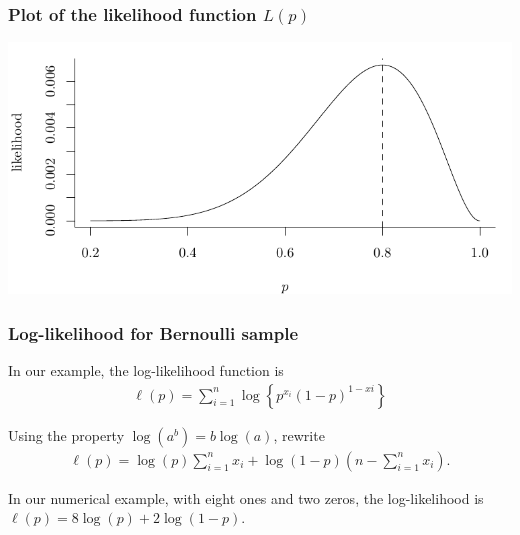 \documentclass{beamer}
\begin{document}
 \begin{frame}[fragile]
\frametitle{Plot of the likelihood function $L(p)$}

\begin{center}
\includegraphics[width = \linewidth]{img/c3/05-likelihood.pdf}
\end{center}


\end{frame}
% 

\begin{frame}
\frametitle{Log-likelihood for Bernoulli sample}
\bi
\item In our example, the log-likelihood function is
\begin{align*}
\ell(p)=\sum_{i=1}^n \log\left\{p^{x_i}(1-p)^{1-xi}\right\}
\end{align*}
\item Using the property $\log(a^b)=b\log(a)$, rewrite
\begin{align*}
\ell(p)=\log(p)\sum_{i=1}^n x_i + \log(1-p) \left(n-\sum_{i=1}^n x_i\right).
\end{align*}
\item In our numerical example, with eight ones and two zeros, the log-likelihood is $\ell(p)=8 \log(p) + 2 \log(1-p)$.
\ei
\end{frame}
\end{document}
